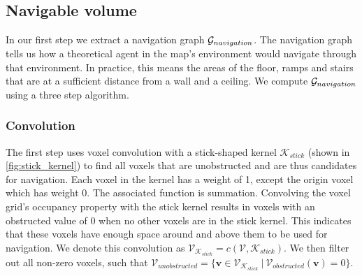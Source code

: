 \subsection{Navigable volume}
In our first step we extract a navigation graph \(\mathcal{G}_{navigation}\). The navigation graph tells us how a theoretical agent in the map's environment would navigate through that environment. In practice, this means the areas of the floor, ramps and stairs that are at a sufficient distance from a wall and a ceiling. We compute \(\mathcal{G}_{navigation}\) using a three step algorithm.

\subsubsection{Convolution}
The first step uses voxel convolution with a stick-shaped kernel \(\mathcal{K}_{stick}\) (shown in \ref{fig:stick_kernel}) to find all voxels that are unobstructed and are thus candidates for navigation. Each voxel in the kernel has a weight of 1, except the origin voxel which has weight 0. The associated function is summation. Convolving the voxel grid's occupancy property with the stick kernel results in voxels with an obstructed value of 0 when no other voxels are in the stick kernel. This indicates that these voxels have enough space around and above them to be used for navigation. We denote this convolution as \(\mathcal{V}_{\mathcal{K}_{stick}} = c(\mathcal{V},\mathcal{K}_{stick})\). We then filter out all non-zero voxels, such that \(\mathcal{V}_{unobstructed}=\{\boldsymbol{v} \in \mathcal{V}_{\mathcal{K}_{stick}}\ |\ \mathcal{V}_{obstructed}(\boldsymbol{v}) = 0\}\). 

